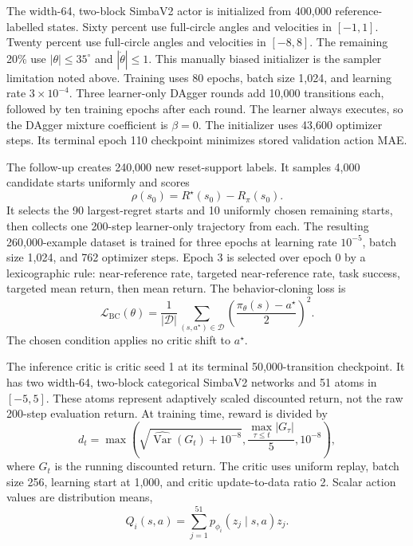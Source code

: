 \documentclass[10pt,twocolumn]{article}
\begin{document}
The width-64, two-block SimbaV2 actor is initialized from 400,000 reference-labelled states. Sixty percent use full-circle angles and velocities in $[-1,1]$. Twenty percent use full-circle angles and velocities in $[-8,8]$. The remaining 20\% use $|\theta|\leq35^\circ$ and $|\dot{\theta}|\leq1$. This manually biased initializer is the sampler limitation noted above. Training uses 80 epochs, batch size 1,024, and learning rate $3\times10^{-4}$. Three learner-only DAgger rounds add 10,000 transitions each, followed by ten training epochs after each round. The learner always executes, so the DAgger mixture coefficient is $\beta=0$. The initializer uses 43,600 optimizer steps. Its terminal epoch 110 checkpoint minimizes stored validation action MAE.

The follow-up creates 240,000 new reset-support labels. It samples 4,000 candidate starts uniformly and scores
\[
\rho(s_0)=R^\star(s_0)-R_\pi(s_0).
\]
It selects the 90 largest-regret starts and 10 uniformly chosen remaining starts, then collects one 200-step learner-only trajectory from each. The resulting 260,000-example dataset is trained for three epochs at learning rate $10^{-5}$, batch size 1,024, and 762 optimizer steps. Epoch 3 is selected over epoch 0 by a lexicographic rule: near-reference rate, targeted near-reference rate, task success, targeted mean return, then mean return. The behavior-cloning loss is
\[
\mathcal{L}_{\mathrm{BC}}(\theta)=
\frac{1}{|\mathcal{D}|}\sum_{(s,a^\star)\in\mathcal{D}}
\left(\frac{\pi_\theta(s)-a^\star}{2}\right)^2.
\]
The chosen condition applies no critic shift to $a^\star$.

The inference critic is critic seed 1 at its terminal 50,000-transition checkpoint. It has two width-64, two-block categorical SimbaV2 networks and 51 atoms in $[-5,5]$. These atoms represent adaptively scaled discounted return, not the raw 200-step evaluation return. At training time, reward is divided by
\[
d_t=\max\left(\sqrt{\widehat{\operatorname{Var}}(G_t)+10^{-8}},
\frac{\max_{\tau\leq t}|G_\tau|}{5},10^{-8}\right),
\]
where $G_t$ is the running discounted return. The critic uses uniform replay, batch size 256, learning start at 1,000, and critic update-to-data ratio 2. Scalar action values are distribution means,
\[
Q_i(s,a)=\sum_{j=1}^{51}p_{\phi_i}(z_j\mid s,a)z_j.
\]
\end{document}
